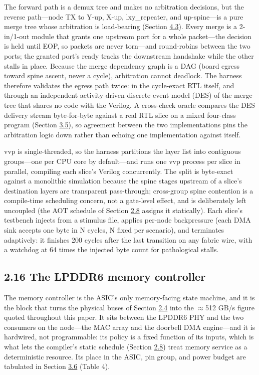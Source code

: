 \documentclass[10pt,twocolumn]{article}
\begin{document}
The forward path is a demux tree and makes no arbitration decisions, but the reverse path---node TX to Y-up, X-up, lxy\_repeater, and up-spine---is a pure merge tree whose arbitration is load-bearing (Section \hyperref[sec:4.3]{4.3}). Every merge is a 2-in/1-out module that grants one upstream port for a whole packet---the decision is held until EOP, so packets are never torn---and round-robins between the two ports; the granted port's ready tracks the downstream handshake while the other stalls in place. Because the merge dependency graph is a DAG (board egress toward spine ascent, never a cycle), arbitration cannot deadlock. The harness therefore validates the egress path twice: in the cycle-exact RTL itself, and through an independent activity-driven discrete-event model (DES) of the merge tree that shares no code with the Verilog. A cross-check oracle compares the DES delivery stream byte-for-byte against a real RTL slice on a mixed four-class program (Section \hyperref[sec:3.5]{3.5}), so agreement between the two implementations pins the arbitration logic down rather than echoing one implementation against itself.

vvp is single-threaded, so the harness partitions the layer list into contiguous groups---one per CPU core by default---and runs one vvp process per slice in parallel, compiling each slice's Verilog concurrently. The split is byte-exact against a monolithic simulation because the spine stages upstream of a slice's destination layers are transparent pass-through; cross-group spine contention is a compile-time scheduling concern, not a gate-level effect, and is deliberately left uncoupled (the AOT schedule of Section \hyperref[sec:2.8]{2.8} assigns it statically). Each slice's testbench injects from a stimulus file, applies per-node backpressure (each DMA sink accepts one byte in N cycles, N fixed per scenario), and terminates adaptively: it finishes 200 cycles after the last transition on any fabric wire, with a watchdog at 64 times the injected byte count for pathological stalls.

\subsection*{2.16 The LPDDR6 memory controller}\label{sec:2.16}

The memory controller is the ASIC's only memory-facing state machine, and it is the block that turns the physical buses of Section \hyperref[sec:2.4]{2.4} into the $\approx$512 GB/s figure quoted throughout this paper. It sits between the LPDDR6 PHY and the two consumers on the node---the MAC array and the doorbell DMA engine---and it is hardwired, not programmable: its policy is a fixed function of its inputs, which is what lets the compiler's static schedule (Section \hyperref[sec:2.8]{2.8}) treat memory service as a deterministic resource. Its place in the ASIC, pin group, and power budget are tabulated in Section \hyperref[sec:3.6]{3.6} (Table 4).
\end{document}
